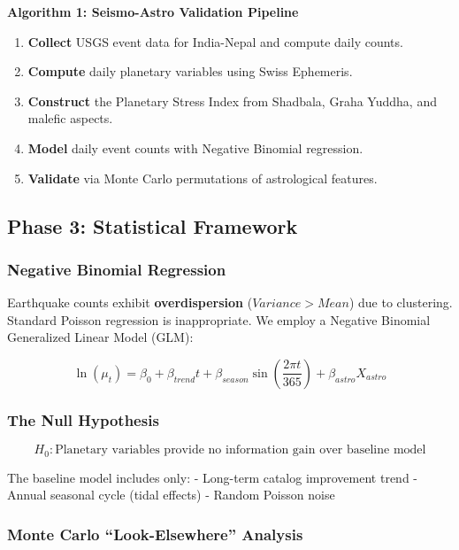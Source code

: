 \documentclass[
  11pt,
  a4paper,
  oneside,
  openany]{article}
\providecommand{\tightlist}{%
  \setlength{\itemsep}{0pt}\setlength{\parskip}{0pt}}\usepackage{longtable,booktabs,array}
\begin{document}
\textbf{Algorithm 1: Seismo-Astro Validation Pipeline}

\begin{enumerate}
\def\labelenumi{\arabic{enumi}.}
\tightlist
\item
  \textbf{Collect} USGS event data for India-Nepal and compute daily
  counts.
\item
  \textbf{Compute} daily planetary variables using Swiss Ephemeris.
\item
  \textbf{Construct} the Planetary Stress Index from Shadbala, Graha
  Yuddha, and malefic aspects.
\item
  \textbf{Model} daily event counts with Negative Binomial regression.
\item
  \textbf{Validate} via Monte Carlo permutations of astrological
  features.
\end{enumerate}

\subsection{Phase 3: Statistical
Framework}\label{phase-3-statistical-framework}

\subsubsection{Negative Binomial
Regression}\label{negative-binomial-regression}

Earthquake counts exhibit \textbf{overdispersion} (\(Variance > Mean\))
due to clustering. Standard Poisson regression is inappropriate. We
employ a Negative Binomial Generalized Linear Model (GLM):

\[
\ln(\mu_t) = \beta_0 + \beta_{trend}t + \beta_{season}\sin(\frac{2\pi t}{365}) + \beta_{astro}X_{astro}
\]

\subsubsection{The Null Hypothesis}\label{the-null-hypothesis}

\[
H_0: \text{Planetary variables provide no information gain over baseline model}
\]

The baseline model includes only: - Long-term catalog improvement trend
- Annual seasonal cycle (tidal effects) - Random Poisson noise

\subsubsection{Monte Carlo ``Look-Elsewhere''
Analysis}\label{monte-carlo-look-elsewhere-analysis}
\end{document}
